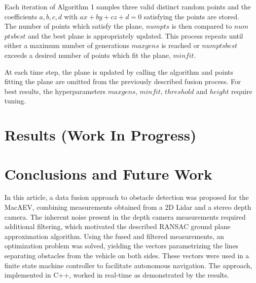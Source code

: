 \documentclass[conference]{IEEEtran}
\begin{document}

Each iteration of Algorithm 1 samples three valid distinct random points and the coefficients $a,b,c,d$ with $ax + by + cz + d = 0$ satisfying the points are stored. The number of points which satisfy the plane, $num$\textunderscore $pts$ is then compared to $num$\textunderscore $pts$\textunderscore $best$ and the best plane is appropriately updated. This process repeats until either a maximum number of generations $max$\textunderscore $gens$ is reached or $num$\textunderscore $pts$\textunderscore $best$ exceeds a desired number of points which fit the plane, $min$\textunderscore $fit$. 

At each time step, the plane is updated by calling the algorithm and points fitting the plane are omitted from the previously described fusion process. For best results, the hyperparameters $max$\textunderscore $gens$, $min$\textunderscore $fit$, $threshold$ and $height$ require tuning. 








\section{Results (Work In Progress)}

\section{Conclusions and Future Work}
In this article, a data fusion approach to obstacle detection was proposed for the MacAEV, combining measurements obtained from a 2D Lidar and a stereo depth camera. The inherent noise present in the depth camera measurements required additional filtering, which motivated the described RANSAC ground plane approximation algorithm. Using the fused and filtered measurements, an optimization problem was solved, yielding the vectors parametrizing the lines separating obstacles from the vehicle on both sides. These vectors were used in a finite state machine controller to facilitate autonomous navigation. The approach, implemented in C++, worked in real-time as demonstrated by the results.
\end{document}
